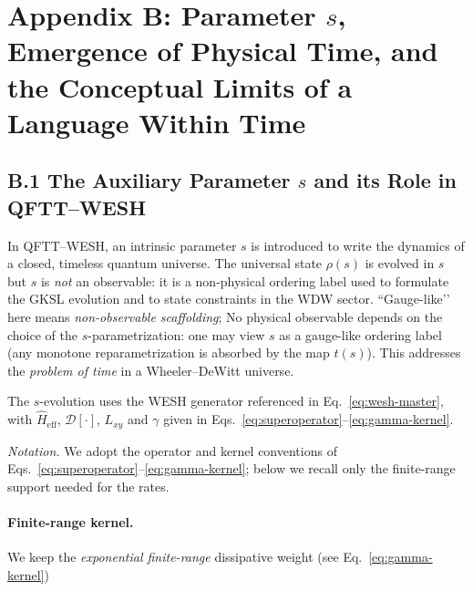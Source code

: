 \documentclass[12pt,a4paper]{article}
\newcommand{\eff}{\mathrm{eff}}
\numberwithin{equation}{section}
\begin{document}
\vspace{1cm}

\section*{Appendix B: Parameter \(s\), Emergence of Physical Time, and the Conceptual Limits of a Language Within Time}

\subsection*{B.1 The Auxiliary Parameter $s$ and its Role in QFTT--WESH}
\vspace{0.5cm}
\begingroup
\setcounter{equation}{0}
\renewcommand{\theequation}{B.\arabic{equation}}
\renewcommand{\theHequation}{B.\arabic{equation}}

In QFTT--WESH, an intrinsic parameter $s$ is introduced to write the dynamics of a closed, timeless quantum universe. The universal state $\rho(s)$ is evolved in $s$ but $s$ is \emph{not} an observable: it is a non-physical ordering label used to formulate the GKSL evolution and to state constraints in the WDW sector. “Gauge-like’’ here means \emph{non-observable scaffolding}; No physical observable depends on the choice of the $s$-parametrization: one may view $s$ as a gauge-like ordering label (any monotone reparametrization is absorbed by the map $t(s)$). This addresses the \emph{problem of time} in a Wheeler--DeWitt universe.

\vspace{0.5cm}

\noindent The $s$-evolution uses the WESH generator referenced in Eq.~\eqref{eq:wesh-master}, with $\hat H_{\eff}$, $\mathcal D[\cdot]$, $L_{xy}$ and $\gamma$ given in Eqs.~\eqref{eq:superoperator}–\eqref{eq:gamma-kernel}.

\vspace{0.5cm}

\noindent\textit{Notation.} We adopt the operator and kernel conventions of Eqs.~\eqref{eq:superoperator}–\eqref{eq:gamma-kernel}; below we recall only the finite-range support needed for the rates.

\paragraph{Finite-range kernel.}
We keep the \emph{exponential finite-range} dissipative weight (see Eq.~\eqref{eq:gamma-kernel})
\end{document}
